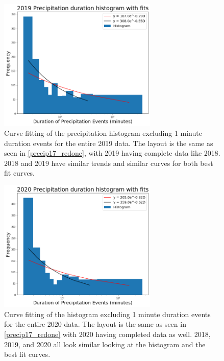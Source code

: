 \documentclass[11pt]{report}
\begin{document}
\begin{figure}[t]
\centering
\includegraphics[width=0.675\textwidth]{Figures/precip19_new.png}
\caption[2019 precipitation duration exponentials with contrasting curve fitting]
{\label{precip19_redone}Curve fitting of the precipitation histogram
  excluding 1 minute duration events for the entire 2019 data. The layout is
  the same as seen in \ref{precip17_redone}, with 2019 having complete data
  like 2018. 2018 and 2019 have similar trends and similar curves for both
  best fit curves.}
\end{figure}

\begin{figure}[b]
\centering
\includegraphics[width=0.675\textwidth]{Figures/precip20_new.png}
\caption[2020 precipitation duration exponentials with contrasting curve fitting]
{\label{precip20_redone}Curve fitting of the histogram excluding 1
  minute duration events for the entire 2020 data. The layout is the same as
  seen in \ref{precip17_redone} with 2020 having completed data as
  well. 2018, 2019, and 2020 all look similar looking at the histogram and
  the best fit curves.}
\end{figure}
\end{document}
